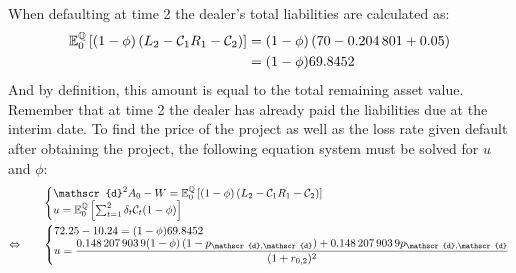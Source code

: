 \documentclass[main.tex]{subfiles}
\begin{document}
            When defaulting at time 2
            the dealer's total liabilities are calculated as:
            \begin{align*}
                \mathbb{E}_{0}^{\mathbb{Q}}\left[
                    (1-\phi)\left(
                        L_{2} - 
                        \mathcal{C}_{1}R_{1}
                        - \mathcal{C}_2
                    \right)
                \right]
                &=
                (1-\phi)\left(\num{70} - \num{0.204801} + \num{0.05}\right)\\
                &=
                (1-\phi)\num{69.8452}
            \end{align*}
            And by definition, this amount is equal to the total remaining asset value.
            Remember that at time 2 the dealer has already paid the liabilities due at the interim date.
            To find the price of the project
            as well as the loss rate given default after obtaining the project,
            the following equation system must be solved for $u$ and $\phi$:
            \begin{align}
                &\left\{\begin{array}{@{}l@{}}
                    \mathscr{d}^{2}A_{0} - W=
                    \mathbb{E}_{0}^{\rnmeasure}\left[
                        (1-\phi)\left(L_{2} - 
                        \mathcal{C}_{1}R_{1}
                        - \mathcal{C}_2\right)
                    \right]
                    \\
                    u =
                    \mathbb{E}_{0}^{\rnmeasure}\left[
                        \sum_{t=1}^{2}
                        \delta_{t}\mathcal{C}_{t}
                        (1-\phi)
                    \right]
                \end{array}\right.
                \label{eqn:swap-example-equation-system}
                \\
                \Leftrightarrow
                \qquad
                &\left\{\begin{array}{@{}l@{}}
                    \displaystyle
                    \num{72.25} - \num{10.24}
                    =
                    (1-\phi)\num{69.8452}
                    \\
                    \displaystyle
                    u =
                    \frac{
                        \num{0.1482079039}(1-\phi)\left(1-p_{\mathscr{d},\mathscr{d}}\right)
                        +
                        \num{0.1482079039}p_{\mathscr{d},\mathscr{d}}
                    }{
                        (1+r_{0,2})^{2}
                    }
                \end{array}\right.
                \nonumber
            \end{align}
\end{document}
